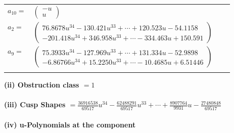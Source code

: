 \documentclass[1p]{elsarticle_modified}
\theoremstyle{definition}
\begin{document}
\begin{tabular}{m{7pt} m{180pt} m{7pt} m{180pt} }
\flushright $a_{10}=$&$\begin{pmatrix}- u\\u\end{pmatrix}$ \\
\flushright $a_{2}=$&$\begin{pmatrix}76.8678 u^{34}-130.421 u^{33}+\cdots+120.523 u-54.1158\\-201.418 u^{34}+346.958 u^{33}+\cdots-334.463 u+150.591\end{pmatrix}$ \\
\flushright $a_{9}=$&$\begin{pmatrix}75.3933 u^{34}-127.969 u^{33}+\cdots+131.334 u-52.9898\\-6.86766 u^{34}+15.2250 u^{33}+\cdots-10.4685 u+6.51446\end{pmatrix}$\\&\end{tabular}
\flushleft \textbf{(ii) Obstruction class $= 1$}\\~\\
\flushleft \textbf{(iii) Cusp Shapes $= \frac{36916538}{69517} u^{34}-\frac{62488291}{69517} u^{33}+\cdots+\frac{8907764}{9931} u-\frac{27480848}{69517}$}\\~\\
\newpage\renewcommand{\arraystretch}{1}
\flushleft \textbf{(iv) u-Polynomials at the component}\newline \\
\end{document}
